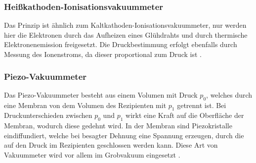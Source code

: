 \subsubsection{Heißkathoden-Ionisationsvakuummeter}
Das Prinzip ist ähnlich zum Kaltkathoden-Ionisationsvakuummeter, nur werden hier die Elektronen durch das Aufheizen eines Glühdrahts und 
durch thermische Elektronenemission freigesetzt. 
Die Druckbestimmung erfolgt ebenfalls durch Messung des Ionenstroms, da dieser proportional zum Druck ist \cite{Pfeiffer, S.94,95}.

\subsubsection{Piezo-Vakuummeter}
Das Piezo-Vakuummeter besteht aus einem Volumen mit Druck $p_0$, welches durch eine Membran von dem Volumen des Rezipienten mit $p_1$ getrennt ist.
Bei Druckunterschieden zwischen $p_0$ und $p_1$ wirkt eine Kraft auf die Oberfläche der Membran, wodurch diese gedehnt wird. In der Membran sind 
Piezokristalle eindiffundiert, welche bei besagter Dehnung eine Spannung erzeugen, durch die auf den Druck im Rezipienten geschlossen werden kann.
Diese Art von Vakuummeter wird vor allem im Grobvakuum eingesetzt \cite{Pfeiffer, S.92}.
















